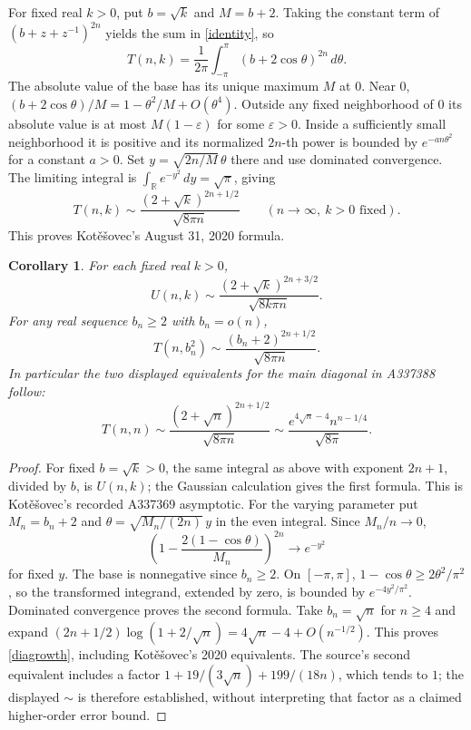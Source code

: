 \documentclass[11pt]{article}
\newtheorem{corollary}[theorem]{Corollary}
\begin{document}
For fixed real $k>0$, put $b=\sqrt k$ and $M=b+2$.
Taking the constant term of $(b+z+z^{-1})^{2n}$ yields the sum
in \eqref{identity}, so
\[
 T(n,k)=\frac1{2\pi}\int_{-\pi}^{\pi}(b+2\cos\theta)^{2n}\,d\theta.
\]
The absolute value of the base has its unique maximum $M$ at $0$.
Near $0$, $(b+2\cos\theta)/M=1-\theta^2/M+O(\theta^4)$.
Outside any fixed neighborhood of $0$ its absolute value is at most
$M(1-\varepsilon)$ for some $\varepsilon>0$.
Inside a sufficiently small neighborhood it is positive and its
normalized $2n$-th power is bounded by $e^{-a n\theta^2}$ for a
constant $a>0$. Set $y=\sqrt{2n/M}\,\theta$ there and use dominated
convergence. The limiting integral is
$\int_{\mathbb R}e^{-y^2}\,dy=\sqrt\pi$, giving
\begin{equation}\label{asympt}
 T(n,k)\sim\frac{(2+\sqrt k)^{2n+1/2}}{\sqrt{8\pi n}}
 \qquad(n\longrightarrow\infty,\ k>0\text{ fixed}).
\end{equation}
This proves Kot\v e\v sovec's August 31, 2020 formula.

\begin{corollary}\label{growth}
For each fixed real $k>0$,
\[
 U(n,k)\sim\frac{(2+\sqrt k)^{2n+3/2}}{\sqrt{8k\pi n}}.
\]
For any real sequence $b_n\geq2$ with $b_n=o(n)$,
\[
 T(n,b_n^2)\sim\frac{(b_n+2)^{2n+1/2}}{\sqrt{8\pi n}}.
\]
In particular the two displayed equivalents for the main diagonal
in A337388 follow:
\begin{equation}\label{diagrowth}
 T(n,n)\sim\frac{(2+\sqrt n)^{2n+1/2}}{\sqrt{8\pi n}}
 \sim\frac{e^{4\sqrt n-4}n^{n-1/4}}{\sqrt{8\pi}}.
\end{equation}
\end{corollary}
\begin{proof}
For fixed $b=\sqrt k>0$, the same integral as above with exponent
$2n+1$, divided by $b$, is $U(n,k)$; the Gaussian calculation
gives the first formula. This is Kot\v e\v sovec's recorded
A337369 asymptotic.
For the varying parameter put $M_n=b_n+2$ and
$\theta=\sqrt{M_n/(2n)}\,y$ in the even integral.
Since $M_n/n\to0$,
\[
 \left(1-\frac{2(1-\cos\theta)}{M_n}\right)^{2n}
 \longrightarrow e^{-y^2}
\]
for fixed $y$. The base is nonnegative since $b_n\geq2$.
On $[-\pi,\pi]$, $1-\cos\theta\geq2\theta^2/\pi^2$,
so the transformed integrand, extended by zero, is bounded by
$e^{-4y^2/\pi^2}$. Dominated convergence proves the second formula.
Take $b_n=\sqrt n$ for $n\geq4$ and expand
$(2n+1/2)\log(1+2/\sqrt n)=4\sqrt n-4+O(n^{-1/2})$.
This proves \eqref{diagrowth}, including Kot\v e\v sovec's 2020
equivalents. The source's second equivalent includes a factor
$1+19/(3\sqrt n)+199/(18n)$, which tends to $1$; the displayed
$\sim$ is therefore established, without interpreting that factor
as a claimed higher-order error bound.
\end{proof}
\end{document}
